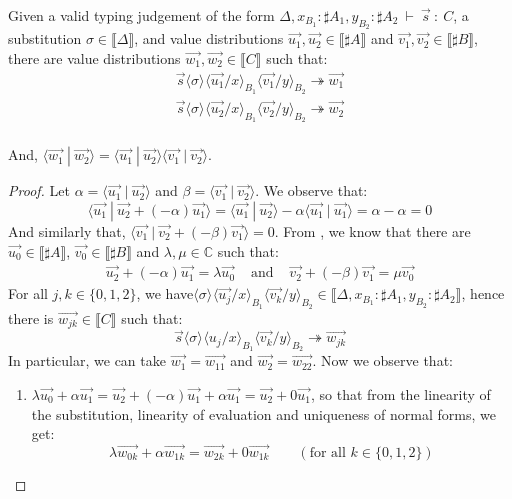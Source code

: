 \documentclass[runningheads,orivec]{llncs}
\newcommand\ansubst[2]{\ensuremath{\langle #1 \rangle_{#2}}}
\def\C{\mathbb{C}}            %
\def\scal#1#2{\langle{#1}~|~{#2}\rangle}
\def\eval{\twoheadrightarrow}
\def\sem#1{\llbracket#1\rrbracket}
\def\TYP#1#2#3{#1~{\vdash}~#2~{:}~#3}
\begin{document}
\begin{lemma}\label{lem:UnitPreserTens} %
Given a valid typing judgement of the form $\TYP{\Delta,x_{B_1}:\sharp A_1, y_{B_2}:\sharp A_2}{\vec{s}}{C}$, a substitution $\sigma\in\sem{\Delta}$, and value distributions $\vec{u_1},\vec{u_2}\in\sem{\sharp A}$ and $\vec{v_1},\vec{v_2}\in\sem{\sharp B}$, there are value distributions $\vec{w_1},\vec{w_2}\in\sem{C}$ such that:
\[
\begin{array}{c}
    \vec{s}\ansubst{\sigma}{}\ansubst{\vec{u_1}/x}{B_1}{\ansubst{\vec{v_1}/y}{B_2}}\eval\vec{w_1}\\
    \vec{s}\ansubst{\sigma}{}\ansubst{\vec{u_2}/x}{B_1}{\ansubst{\vec{v_2}/y}{B_2}}\eval\vec{w_2}\\
\end{array}
\]

And, $\scal{\vec{w_1}}{\vec{w_2}} = \scal{\vec{u_1}}{\vec{u_2}} \scal{\vec{v_1}}{\vec{v_2}}$.

\begin{proof}
    Let $\alpha=\scal{\vec{u_1}}{\vec{u_2}}$ and $\beta=\scal{\vec{v_1}}{\vec{v_2}}$. We observe that:
    \[
    \scal{\vec{u_1}}{\vec{u_2}+(-\alpha)\vec{u_1}} = \scal{\vec{u_1}}{\vec{u_2}} - \alpha \scal{\vec{u_1}}{\vec{u_1}} = \alpha - \alpha = 0
    \]
    And similarly that, $\scal{\vec{v_1}}{\vec{v_2}+ (-\beta) \vec{v_1}} = 0$. From , we know that there are $\vec{u_0}\in\sem{\sharp A}$, $\vec{v_0}\in\sem{\sharp B}$ and $\lambda,\mu\in\C$ such that:
    \begin{align*}
        \vec{u_2} +(-\alpha)\vec{u_1} = \lambda\vec{u_0}& \text{ and } & \vec{v_2} + (-\beta)\vec{v_1} = \mu\vec{v_0} 
    \end{align*}
    For all $j,k\in\{0,1,2\}$, we have$\ansubst{\sigma}{}\ansubst{\vec{u_j}/x}{B_1}\ansubst{\vec{v_k}/y}{B_2}\in\sem{\Delta,x_{B_1}:\sharp A_1, y_{B_2}:\sharp A_2}$, hence there is $\vec{w_{jk}}\in\sem{C}$ such that:
    \[
    \vec{s}\ansubst{\sigma}{}\ansubst{u_j/x}{B_1}\ansubst{\vec{v_k}/y}{B_2}\eval\vec{w_{jk}}
    \]
    In particular, we can take $\vec{w_1}=\vec{w_{11}}$ and $\vec{w_2}=\vec{w_{22}}$. Now we observe that:
    \begin{enumerate}
        \item\label{A9:it1} $\lambda \vec{u_0} + \alpha\vec{u_1}=\vec{u_2} + (-\alpha) \vec{u_1} + \alpha \vec{u_1} = \vec{u_2} + 0 \vec{u_1}$, so that from the linearity of the substitution, linearity of evaluation and uniqueness of normal forms, we get:
        \[
        \lambda\vec{w_{0k}} + \alpha \vec{w_{1k}} = \vec{w_{2k}} + 0 \vec{w_{1k}} \qquad(\text{for all }k\in\{0,1,2\})
        \]
        

\end{enumerate}
\end{proof}
\end{lemma}
\end{document}
